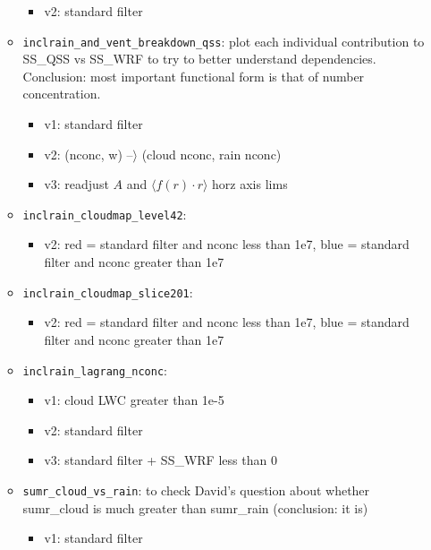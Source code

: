 \documentclass{article}
\begin{document}
\begin{itemize}
\begin{itemize}
\begin{itemize}
			\item v2: standard filter
		\end{itemize}
		\item \texttt{inclrain\_and\_vent\_breakdown\_qss}: plot each individual contribution to SS\_QSS vs SS\_WRF to try to better understand dependencies. Conclusion: most important functional form is that of number concentration.
		\begin{itemize}
			\item v1: standard filter
			\item v2: (nconc, w) --$\rangle$ (cloud nconc, rain nconc)
			\item v3: readjust $A$ and $\langle f(r)\cdot r \rangle$ horz axis lims
		\end{itemize}
		\item \texttt{inclrain\_cloudmap\_level42}:
		\begin{itemize}
			\item v2: red = standard filter and nconc less than 1e7, blue = standard filter and nconc greater than 1e7
		\end{itemize}
		\item \texttt{inclrain\_cloudmap\_slice201}:
		\begin{itemize}
			\item v2: red = standard filter and nconc less than 1e7, blue = standard filter and nconc greater than 1e7
		\end{itemize}
		\item \texttt{inclrain\_lagrang\_nconc}: 
		\begin{itemize}
			\item v1: cloud LWC greater than 1e-5 
			\item v2: standard filter
			\item v3: standard filter + SS\_WRF less than 0
		\end{itemize}
		\item \texttt{sumr\_cloud\_vs\_rain}: to check David's question about whether sumr\_cloud is much greater than sumr\_rain (conclusion: it is)
		\begin{itemize}
			\item v1: standard filter
		\end{itemize}
	\end{itemize}

\end{itemize}
\end{document}
